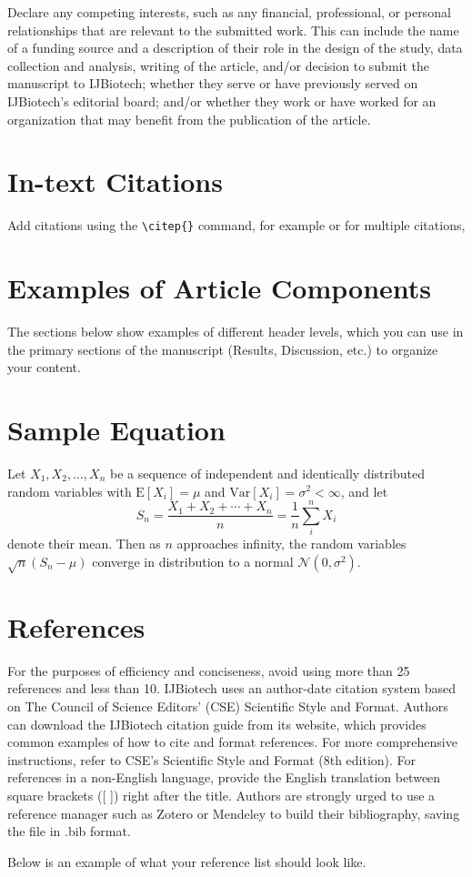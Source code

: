 \documentclass[10pt,twocolumn,twoside]{base/ijb}
\begin{document}
Declare any competing interests, such as any financial, professional, or personal relationships that are relevant to the submitted work. This can include the name of a funding source and a description of their role in the design of the study, data collection and analysis, writing of the article, and/or decision to submit the manuscript to IJBiotech; whether they serve or have previously served on IJBiotech’s editorial board; and/or whether they work or have worked for an organization that may benefit from the publication of the article.

\section{In-text Citations}

Add citations using the \verb|\citep{}| command, for example \citep{neher2013genealogies} or for multiple citations, \citep{neher2013genealogies, rodelsperger2014characterization}

\section{Examples of Article Components}
\label{sec:examples}

The sections below show examples of different header levels, which you can use in the primary sections of the manuscript (Results, Discussion, etc.) to organize your content.

\section{Sample Equation}

Let $X_1, X_2, \ldots, X_n$ be a sequence of independent and identically distributed random variables with $\text{E}[X_i] = \mu$ and $\text{Var}[X_i] = \sigma^2 < \infty$, and let
\begin{equation}
S_n = \frac{X_1 + X_2 + \cdots + X_n}{n}
      = \frac{1}{n}\sum_{i}^{n} X_i
\label{eq:refname1}
\end{equation}
denote their mean. Then as $n$ approaches infinity, the random variables $\sqrt{n}(S_n - \mu)$ converge in distribution to a normal $\mathcal{N}(0, \sigma^2)$.

\section*{References}

For the purposes of efficiency and conciseness, avoid using more than 25 references and less than 10. IJBiotech uses an author-date citation system based on The Council of Science Editors' (CSE) Scientific Style and Format. Authors can download the IJBiotech citation guide from its website, which provides common examples of how to cite and format references. For more comprehensive instructions, refer to CSE's Scientific Style and Format (8th edition). For references in a non-English language, provide the English translation between square brackets ([ ]) right after the title. Authors are strongly urged to use a reference manager such as Zotero or Mendeley to build their bibliography, saving the file in .bib format.

Below is an example of what your reference list should look like.


\atColsEnd{\vfill}
\end{document}

